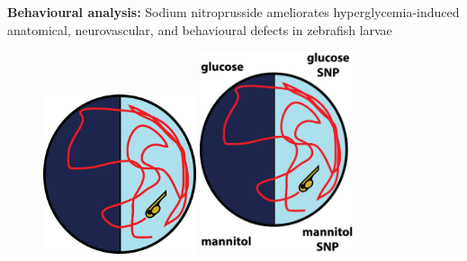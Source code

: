 \documentclass{beamer}
\begin{document}
{\begin{frame}{\textbf{Behavioural analysis:} Sodium nitroprusside ameliorates hyperglycemia-induced anatomical, neurovascular, and behavioural defects in zebrafish larvae}
\begin{figure}
	\begin{overprint}
		\centerline{\includegraphics[width=0.4\textwidth]{figures/zebrafish}}
		\centerline{\includegraphics[width=0.4\textwidth]{figures/zebrafish2}}
	\end{overprint}
\end{figure}	
\end{frame}

}
\end{document}
